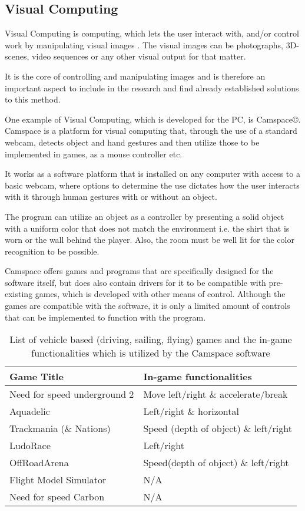 \subsection{Visual Computing}
Visual Computing is computing, which lets the user interact with, and/or control work by manipulating visual images \parencite{Rouse2013}. The visual images can be photographs, 3D-scenes, video sequences or any other visual output for that matter.

It is the core of controlling and manipulating images and is therefore an important aspect to include in the research and find already established solutions to this method.
\bigskip

One example of Visual Computing, which is developed for the PC, is Camspace\copyright. Camspace is a platform for visual computing that, through the use of a standard webcam, detects object and hand gestures and then utilize those to be implemented in games, as a mouse controller etc. \parencite{Camspace2009}

It works as a software platform that is installed on any computer with access to a basic webcam, where options to determine the use dictates how the user interacts with it through human gestures with or without an object.
\bigskip

The program can utilize an object as a controller by presenting a solid object with a uniform color that does not match the environment i.e. the shirt that is worn or the wall behind the player. Also, the room must be well lit for the color recognition to be possible.
\bigskip

Camspace offers games and programs that are specifically designed for the software itself, but does also contain drivers for it to be compatible with pre-existing games, which is developed with other means of control. Although the games are compatible with the software, it is only a limited amount of controls that can be implemented to function with the program.

\begin{table}[h]
\begin{tabular}{| l | l }
Game Title & In-game functionalities\\
\hline \hline
Need for speed underground 2 & Move left/right \& accelerate/break\\
Aquadelic & Left/right \& horizontal\\
Trackmania (\& Nations) & Speed (depth of object) \& left/right\\
LudoRace & Left/right\\
OffRoadArena & Speed(depth of object) \& left/right\\
Flight Model Simulator & N/A\\
Need for speed Carbon & N/A\\
\end{tabular}
\caption{List of vehicle based (driving, sailing, flying) games and the in-game functionalities which is utilized by the Camspace software\parencite{Camspace2009}}
\label{tab:camspace}
\end{table}

